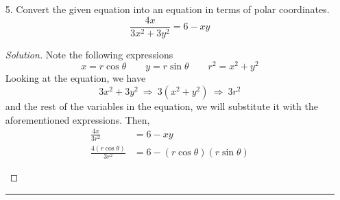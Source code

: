 \documentclass[12pt]{article}
\begin{document}
\begin{enumerate}
			\begin{proof}[Solution]
				Determine \(r\) which is expressed by
				\[r^2 = x^2+y^2\qquad \Longrightarrow \qquad r=\sqrt{x^2+y^2}\]
				since,
				\[x=2,\qquad y=-6\]
				then,
				\[r= \sqrt{(2)^2+(-6)^2}=\sqrt{40}=\sqrt{4\cdot10}=2\sqrt{10}\]
				For the angles, we have two ways. Thus, we have two angles as well. The angle is defined as
				\[\theta_1=\tan^{-1}\left(\frac{y}{x}\right)\quad \text{OR} \quad \theta_2=\theta_1+\pi\]
				then,
				\begin{align*}
					\theta_1 & = \tan^{-1}\left(\frac{y}{x}\right) \\
					& = \tan^{-1}\left(\frac{-6}{2}\right) = -1.249 \\
					\theta_2 & = \theta_1 +\pi \\
					& = -1.249 + \pi \approx 1.893
				\end{align*}
				referring to the given coordinate, that is \((2,-6)\), the point falls on quadrant 4. Therefore, we must choose an angle that also falls on the 4th quadrant. Analyzing both angles, \(\theta_1\) falls on quadrant 4. Thus, our polar coordinates is
				\begin{center}
				\end{center}
			\end{proof}
			\hrule
			
			\item[5.] Convert the given equation into an equation in terms of polar coordinates.
				\[\frac{4x}{3x^2+3y^2} = 6-xy\]
				
				\begin{proof}[Solution]
					Note the following expressions
					\[x=r\cos \theta\qquad y=r\sin \theta\qquad r^2=x^2+y^2\]
					Looking at the equation, we have
					\[3x^2+3y^2~ \Longrightarrow ~ 3\left(x^2+y^2\right) ~ \Longrightarrow ~ 3r^2\]
					and the rest of the variables in the equation, we will substitute it with the aforementioned expressions. Then,
					\begin{align*}
						\frac{4x}{3r^2} & = 6-xy \\
						\frac{4\left(r\cos \theta\right)}{3r^2} & = 6-\left(r\cos \theta\right)\left(r\sin \theta\right)
					\end{align*}
					\begin{center}
					\end{center}
				\end{proof}
				\hrule
			

\end{enumerate}
\end{document}
